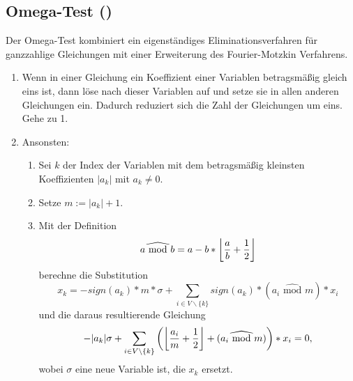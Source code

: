 \subsection{Omega-Test (\cite{Pugh95a})}

\def\MOD{\widehat{\textrm{\ mod\ }}}
Der Omega-Test kombiniert ein eigenständiges Eliminationsverfahren für
ganzzahlige Gleichungen mit einer Erweiterung des Fourier-Motzkin
Verfahrens.

\begin{enumerate}
\item Wenn in einer Gleichung ein Koeffizient einer Variablen
  betragsmäßig gleich eins ist, dann löse nach dieser Variablen auf
  und setze sie in allen anderen Gleichungen ein. Dadurch reduziert
  sich die Zahl der Gleichungen um eins. Gehe zu 1.
\item Ansonsten:
  \begin{enumerate}
  \item Sei $k$ der Index der Variablen mit dem betragsmäßig kleinsten
    Koeffizienten $|a_k|$ mit $a_k\not=0$.
  \item Setze $m:= |a_k|+1$.
  \item Mit der Definition $$a\MOD b = a - b *
    \left\lfloor {a\over b} + {1 \over 2}\right \rfloor$$
    berechne die Substitution $$x_k = -sign(a_k)*m*\sigma +
    \sum_{i\in V\backslash\{k\}} sign(a_k)*(a_i \MOD m) * x_i$$
    und die daraus resultierende Gleichung
    $$-|a_k|\sigma + \sum_{i\in V\backslash\{k\}}\left(\left\lfloor{a_i\over
        m} + {1\over 2}\right\rfloor + (a_i\MOD m)\right) * x_i = 0,$$
    wobei $\sigma$ eine neue Variable ist, die $x_k$ ersetzt.


\end{enumerate}
\end{enumerate}
